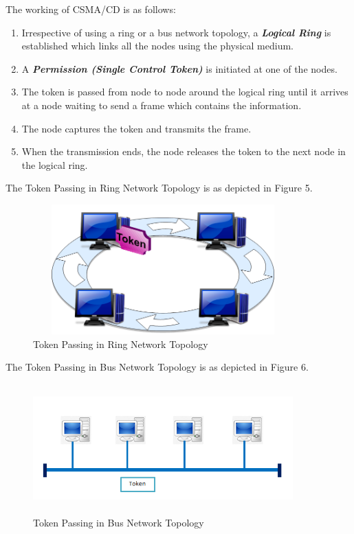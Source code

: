 \documentclass[12pt]{article}
\begin{document}
The working of CSMA/CD is as follows:
\begin{enumerate}[label=(\alph*)]
    \item Irrespective of using a ring or a bus network topology, a \textbf{\textit{Logical Ring}} is established which links all the nodes using the physical medium.
    \item A \textbf{\textit{Permission (Single Control Token)}} is initiated at one of the nodes.
    \item The token is passed from node to node around the logical ring until it arrives at a node waiting to send a frame which contains the information.
    \item The node captures the token and transmits the frame.
    \item When the transmission ends, the node releases the token to the next node in the logical ring.
\end{enumerate}

The Token Passing in Ring Network Topology is as depicted in Figure 5.
\begin{figure}
    \centering
    \includegraphics[width=10cm, height=5cm]{token_ring.png}
    \caption{Token Passing in Ring Network Topology}
\end{figure}

The Token Passing in Bus Network Topology is as depicted in Figure 6.
\begin{figure}
    \centering
    \includegraphics[width=10cm, height=5cm]{token_bus.png}
    \caption{Token Passing in Bus Network Topology}
\end{figure}
\end{document}
